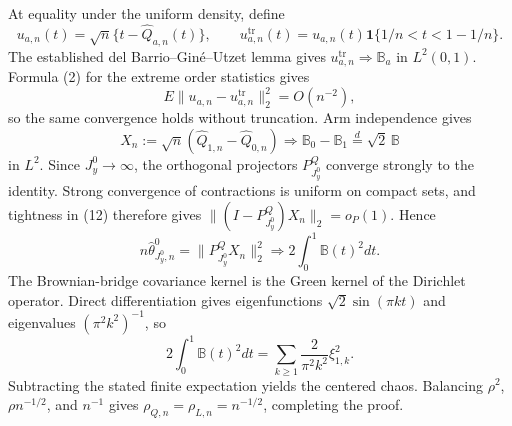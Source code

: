 At equality under the uniform density, define
\[
u_{a,n}(t)=\sqrt n\{t-\widehat Q_{a,n}(t)\},
\qquad
u_{a,n}^{\mathrm{tr}}(t)=u_{a,n}(t)\mathbf1\{1/n<t<1-1/n\}.
\]
The established del Barrio--Gin\'e--Utzet lemma gives \(u_{a,n}^{\mathrm{tr}}\Rightarrow\mathbb B_a\) in \(L^2(0,1)\).  Formula (2) for the extreme order statistics gives
\[
E\|u_{a,n}-u_{a,n}^{\mathrm{tr}}\|_2^2=O(n^{-2}), \tag{11}
\]
so the same convergence holds without truncation.  Arm independence gives
\[
X_n:=\sqrt n(\widehat Q_{1,n}-\widehat Q_{0,n})
\Rightarrow\mathbb B_0-\mathbb B_1\stackrel d=\sqrt2\,\mathbb B \tag{12}
\]
in \(L^2\).  Since \(J_y^0\to\infty\), the orthogonal projectors \(P^Q_{J_y^0}\) converge strongly to the identity.  Strong convergence of contractions is uniform on compact sets, and tightness in (12) therefore gives \(\|(I-P^Q_{J_y^0})X_n\|_2=o_P(1)\).  Hence
\[
n\widehat\theta^0_{J_y^0,n}=\|P^Q_{J_y^0}X_n\|_2^2
\Rightarrow2\int_0^1\mathbb B(t)^2dt. \tag{13}
\]
The Brownian-bridge covariance kernel is the Green kernel of the Dirichlet operator.  Direct differentiation gives eigenfunctions \(\sqrt2\sin(\pi kt)\) and eigenvalues \((\pi^2k^2)^{-1}\), so
\[
2\int_0^1\mathbb B(t)^2dt
=\sum_{k\ge1}\frac{2}{\pi^2k^2}\xi_{1,k}^2. \tag{14}
\]
Subtracting the stated finite expectation yields the centered chaos.  Balancing \(\rho^2\), \(\rho n^{-1/2}\), and \(n^{-1}\) gives \(\rho_{Q,n}=\rho_{L,n}=n^{-1/2}\), completing the proof.